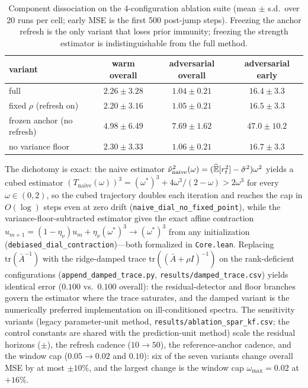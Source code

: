 \begin{table}[h]
\centering
\footnotesize
\caption{Component dissociation on the 4-configuration ablation suite (mean $\pm$ s.d.\ over 20 runs per cell; early MSE is the first 500 post-jump steps). Freezing the anchor refresh is the only variant that loses prior immunity; freezing the strength estimator is indistinguishable from the full method.}
\label{tab:ablation}
\begin{tabular}{lccc}
\toprule
variant & warm overall & adversarial overall & adversarial early \\
\midrule
full & $2.26 \pm 3.28$ & $1.04 \pm 0.21$ & $16.4 \pm 3.3$ \\
fixed $\rho$ (refresh on) & $2.20 \pm 3.16$ & $1.05 \pm 0.21$ & $16.5 \pm 3.3$ \\
frozen anchor (no refresh) & $4.98 \pm 6.49$ & $7.69 \pm 1.62$ & $47.0 \pm 10.2$ \\
no variance floor & $2.30 \pm 3.33$ & $1.06 \pm 0.21$ & $16.7 \pm 3.3$ \\
\bottomrule
\end{tabular}
\end{table}

The dichotomy is exact: the naive estimator $\hat\nu^2_{\mathrm{naive}}(\omega) = (\widehat{\mathbb{E}}[r_t^2] - \hat\sigma^2)\omega^2$ yields a cubed estimator $(T_{\mathrm{naive}}(\omega))^3 = (\omega^*)^3 + 4\omega^3/(2-\omega) > 2\omega^3$ for every $\omega \in (0,2)$, so the cubed trajectory doubles each iteration and reaches the cap in $O(\log)$ steps even at zero drift (\texttt{naive\_dial\_no\_fixed\_point}), while the variance-floor-subtracted estimator gives the exact affine contraction $u_{m+1} = (1-\eta_\nu)u_m + \eta_\nu(\omega^*)^3 \to (\omega^*)^3$ from any initialization (\texttt{debiased\_dial\_contraction})---both formalized in \texttt{Core.lean}.
Replacing $\mathrm{tr}(\bar A^{-1})$ with the ridge-damped trace $\mathrm{tr}((\bar A + \rho I)^{-1})$ on the rank-deficient configurations (\texttt{append\_damped\_trace.py}, \texttt{results/damped\_trace.csv}) yields identical error ($0.100$ vs.\ $0.100$ overall): the residual-detector and floor branches govern the estimator where the trace saturates, and the damped variant is the numerically preferred implementation on ill-conditioned spectra.
The sensitivity variants (legacy parameter-unit method, \texttt{results/ablation\_spar\_kf.csv}; the control constants are shared with the prediction-unit method) scale the residual horizons ($\pm$), the refresh cadence ($10 \to 50$), the reference-anchor cadence, and the window cap ($0.05 \to 0.02$ and $0.10$): six of the seven variants change overall MSE by at most $\pm 10\%$, and the largest change is the window cap $\omega_{\max} = 0.02$ at $+16\%$.

